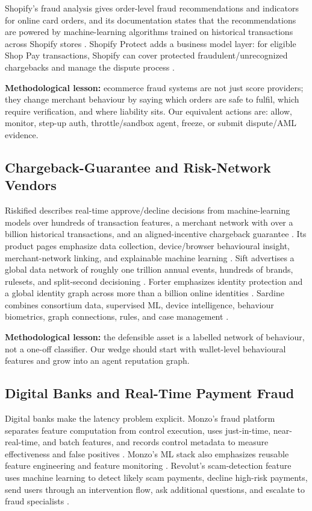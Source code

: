 \documentclass[11pt]{article}
\begin{document}
Shopify's fraud analysis gives order-level fraud recommendations and indicators
for online card orders, and its documentation states that the recommendations
are powered by machine-learning algorithms trained on historical transactions
across Shopify stores \cite{shopifyFraud}.  Shopify Protect adds a business
model layer: for eligible Shop Pay transactions, Shopify can cover protected
fraudulent/unrecognized chargebacks and manage the dispute process
\cite{shopifyProtect}.

\textbf{Methodological lesson:} ecommerce fraud systems are not just score
providers; they change merchant behaviour by saying which orders are safe to
fulfil, which require verification, and where liability sits.  Our equivalent
actions are: allow, monitor, step-up auth, throttle/sandbox agent, freeze, or
submit dispute/AML evidence.

\subsection{Chargeback-Guarantee and Risk-Network Vendors}

Riskified describes real-time approve/decline decisions from machine-learning
models over hundreds of transaction features, a merchant network with over a
billion historical transactions, and an aligned-incentive chargeback guarantee
\cite{riskifiedGuarantee}.  Its product pages emphasize data collection,
device/browser behavioural insight, merchant-network linking, and explainable
machine learning \cite{riskifiedSolutions}.  Sift advertises a global data
network of roughly one trillion annual events, hundreds of brands, rulesets,
and split-second decisioning \cite{sift}.  Forter emphasizes identity
protection and a global identity graph across more than a billion online
identities \cite{forter}.  Sardine combines consortium data, supervised ML,
device intelligence, behaviour biometrics, graph connections, rules, and case
management \cite{sardineDocs,sardineHome}.

\textbf{Methodological lesson:} the defensible asset is a labelled network of
behaviour, not a one-off classifier.  Our wedge should start with wallet-level
behavioural features and grow into an agent reputation graph.

\subsection{Digital Banks and Real-Time Payment Fraud}

Digital banks make the latency problem explicit.  Monzo's fraud platform
separates feature computation from control execution, uses just-in-time,
near-real-time, and batch features, and records control metadata to measure
effectiveness and false positives \cite{monzoReactive}.  Monzo's ML stack also
emphasizes reusable feature engineering and feature monitoring
\cite{monzoML}.  Revolut's scam-detection feature uses machine learning to
detect likely scam payments, decline high-risk payments, send users through an
intervention flow, ask additional questions, and escalate to fraud specialists
\cite{revolutScam}.
\end{document}
